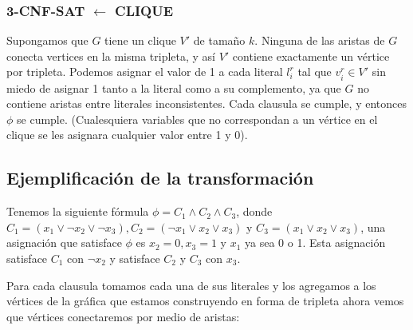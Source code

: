 \documentclass[a4paper]{article}
\begin{document}
\subsubsection{3-CNF-SAT $\leftarrow$ CLIQUE}

Supongamos que $G$ tiene un clique $V'$ de tamaño $k$. Ninguna de las aristas de $G$ conecta vertices en la misma tripleta, y así $V'$ contiene exactamente un vértice por tripleta. Podemos asignar el valor de 1 a cada literal $l^r_i$ tal que $v^r_i\in V'$ sin miedo de asignar 1 tanto a la literal como a su complemento, ya que $G$ no contiene aristas entre literales inconsistentes. Cada clausula se cumple, y entonces $\phi$ se cumple. (Cualesquiera variables que no correspondan a un vértice en el clique se les asignara cualquier valor entre 1 y 0).

\subsection{Ejemplificación de la transformación}

Tenemos la siguiente fórmula $\phi = C_1 \land C_2 \land C_3$, donde $C_1=(x_1 \lor \neg x_2 \lor \neg x_3), C_2=( \neg x_1 \lor x_2 \lor x_3)$ y $C_3=(x_1\lor x_2 \lor x_3)$, una asignación que satisface $\phi$ es $x_2=0,x_3=1$ y $x_1$ ya sea 0 o 1. Esta asignación satisface $C_1$ con $\neg x_2$ y satisface $C_2$ y $C_3$ con $x_3$.

Para cada clausula tomamos cada una de sus literales y los agregamos a los vértices de la gráfica que estamos construyendo en forma de tripleta ahora vemos que vértices conectaremos por medio de aristas:\\
\end{document}

